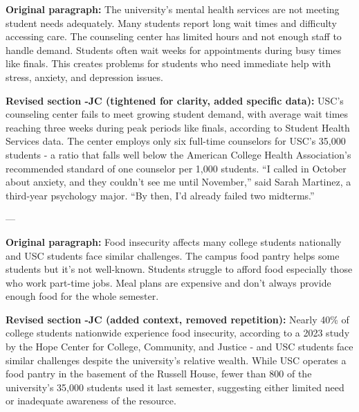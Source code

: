 \documentclass[12pt]{article}
\begin{document}
\begin{beforebox}
\textbf{Original paragraph:}
The university's mental health services are not meeting student needs adequately. Many students report long wait times and difficulty accessing care. The counseling center has limited hours and not enough staff to handle demand. Students often wait weeks for appointments during busy times like finals. This creates problems for students who need immediate help with stress, anxiety, and depression issues.
\end{beforebox}

\begin{afterbox}
\textbf{\textcolor{atlantic}{Revised section -JC (tightened for clarity, added specific data):}}
USC's counseling center fails to meet growing student demand, with average wait times reaching three weeks during peak periods like finals, according to Student Health Services data. The center employs only six full-time counselors for USC's 35,000 students - a ratio that falls well below the American College Health Association's recommended standard of one counselor per 1,000 students. ``I called in October about anxiety, and they couldn't see me until November,'' said Sarah Martinez, a third-year psychology major. ``By then, I'd already failed two midterms.''
\end{afterbox}

---

\begin{beforebox}
\textbf{Original paragraph:}
Food insecurity affects many college students nationally and USC students face similar challenges. The campus food pantry helps some students but it's not well-known. Students struggle to afford food especially those who work part-time jobs. Meal plans are expensive and don't always provide enough food for the whole semester.
\end{beforebox}

\begin{afterbox}
\textbf{\textcolor{atlantic}{Revised section -JC (added context, removed repetition):}}
Nearly 40\% of college students nationwide experience food insecurity, according to a 2023 study by the Hope Center for College, Community, and Justice - and USC students face similar challenges despite the university's relative wealth. While USC operates a food pantry in the basement of the Russell House, fewer than 800 of the university's 35,000 students used it last semester, suggesting either limited need or inadequate awareness of the resource.
\end{afterbox}
\end{document}
